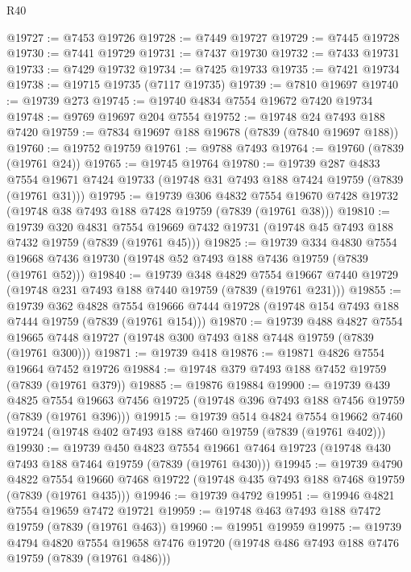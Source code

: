 \begin{lexlean}{R40}
\begin{coremodule}
@19727 := @7453 @19726
@19728 := @7449 @19727
@19729 := @7445 @19728
@19730 := @7441 @19729
@19731 := @7437 @19730
@19732 := @7433 @19731
@19733 := @7429 @19732
@19734 := @7425 @19733
@19735 := @7421 @19734
@19738 := @19715 @19735 (@7117 @19735)
@19739 := @7810 @19697
@19740 := @19739 @273
@19745 := @19740 @4834 @7554 @19672 @7420 @19734
@19748 := @9769 @19697 @204 @7554
@19752 := @19748 @24 @7493 @188 @7420
@19759 := @7834 @19697 @188 @19678 (@7839 (@7840 @19697 @188))
@19760 := @19752 @19759
@19761 := @9788 @7493
@19764 := @19760 (@7839 (@19761 @24))
@19765 := @19745 @19764
@19780 := @19739
    @287
    @4833
    @7554
    @19671
    @7424
    @19733
    (@19748 @31 @7493 @188 @7424 @19759 (@7839 (@19761 @31)))
@19795 := @19739
    @306
    @4832
    @7554
    @19670
    @7428
    @19732
    (@19748 @38 @7493 @188 @7428 @19759 (@7839 (@19761 @38)))
@19810 := @19739
    @320
    @4831
    @7554
    @19669
    @7432
    @19731
    (@19748 @45 @7493 @188 @7432 @19759 (@7839 (@19761 @45)))
@19825 := @19739
    @334
    @4830
    @7554
    @19668
    @7436
    @19730
    (@19748 @52 @7493 @188 @7436 @19759 (@7839 (@19761 @52)))
@19840 := @19739
    @348
    @4829
    @7554
    @19667
    @7440
    @19729
    (@19748 @231 @7493 @188 @7440 @19759 (@7839 (@19761 @231)))
@19855 := @19739
    @362
    @4828
    @7554
    @19666
    @7444
    @19728
    (@19748 @154 @7493 @188 @7444 @19759 (@7839 (@19761 @154)))
@19870 := @19739
    @488
    @4827
    @7554
    @19665
    @7448
    @19727
    (@19748 @300 @7493 @188 @7448 @19759 (@7839 (@19761 @300)))
@19871 := @19739 @418
@19876 := @19871 @4826 @7554 @19664 @7452 @19726
@19884 := @19748 @379 @7493 @188 @7452 @19759 (@7839 (@19761 @379))
@19885 := @19876 @19884
@19900 := @19739
    @439
    @4825
    @7554
    @19663
    @7456
    @19725
    (@19748 @396 @7493 @188 @7456 @19759 (@7839 (@19761 @396)))
@19915 := @19739
    @514
    @4824
    @7554
    @19662
    @7460
    @19724
    (@19748 @402 @7493 @188 @7460 @19759 (@7839 (@19761 @402)))
@19930 := @19739
    @450
    @4823
    @7554
    @19661
    @7464
    @19723
    (@19748 @430 @7493 @188 @7464 @19759 (@7839 (@19761 @430)))
@19945 := @19739
    @4790
    @4822
    @7554
    @19660
    @7468
    @19722
    (@19748 @435 @7493 @188 @7468 @19759 (@7839 (@19761 @435)))
@19946 := @19739 @4792
@19951 := @19946 @4821 @7554 @19659 @7472 @19721
@19959 := @19748 @463 @7493 @188 @7472 @19759 (@7839 (@19761 @463))
@19960 := @19951 @19959
@19975 := @19739
    @4794
    @4820
    @7554
    @19658
    @7476
    @19720
    (@19748 @486 @7493 @188 @7476 @19759 (@7839 (@19761 @486)))

\end{coremodule}
\end{lexlean}
